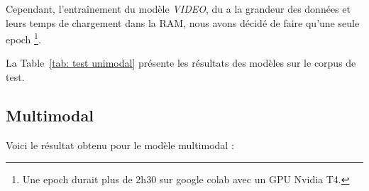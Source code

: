 \documentclass[a4paper]{article}
\begin{document}
Cependant, l'entraînement du modèle \textit{VIDEO}, du a la grandeur des données et 
leurs temps de chargement dans la RAM, nous avons décidé de faire qu'une seule epoch
\footnote{Une epoch durait plus de 2h30 sur google colab avec un GPU Nvidia T4.}.

La Table~\ref{tab: test unimodal} présente les résultats des modèles sur le corpus de test.



\subsection{Multimodal}

Voici le résultat obtenu pour le modèle multimodal :


\end{document}
